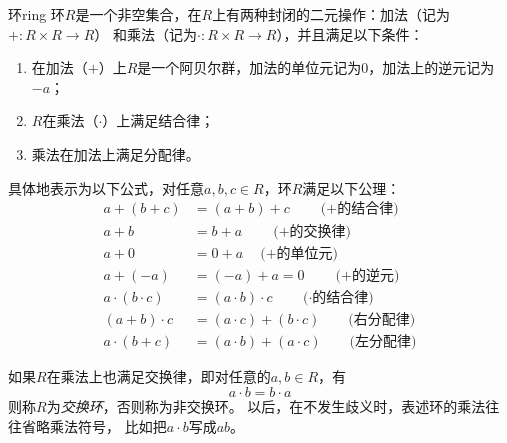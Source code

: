 \begin{definition}{环}{ring}
环$R$是一个非空集合，在$R$上有两种封闭的二元操作：加法（记为$+\colon R \times R \to R$）
和乘法（记为$\cdot\colon R \times R \to R$），并且满足以下条件：
\begin{enumerate}
\item 在加法（$+$）上$R$是一个阿贝尔群，加法的单位元记为$0$，加法上的逆元记为$-a$；
\item $R$在乘法（$\cdot$）上满足结合律；
\item 乘法在加法上满足分配律。
\end{enumerate}
\end{definition}
具体地表示为以下公式，对任意$a,b, c\in R$，环$R$满足以下公理：
\begin{align}
a + (b + c ) &= (a + b) + c   \quad \quad \text{($+$的结合律)}\\
a + b  &=  b + a   \quad \quad \text{($+$的交换律)}\\
a + 0 &= 0 + a \quad \text{($+$的单位元)}\\
a + (- a) &= (- a) + a = 0 \quad \quad \text{($+$的逆元)}\\
a \cdot (b \cdot c) &= (a \cdot b) \cdot c \quad  \quad\text{($\cdot$的结合律)}\\
(a + b) \cdot c &= (a \cdot c) + (b \cdot c) \quad \quad \text{(右分配律)}\\
a \cdot (b + c) &= (a \cdot b) + (a \cdot c) \quad \quad \text{(左分配律)}
\end{align}

如果$R$在乘法上也满足交换律，即对任意的$a, b \in R$，有
\[ a \cdot b = b \cdot a \]
则称$R$为\emph{交换环}，否则称为非交换环。
以后，在不发生歧义时，表述环的乘法往往省略乘法符号，
比如把$a \cdot b$写成$ab$。

